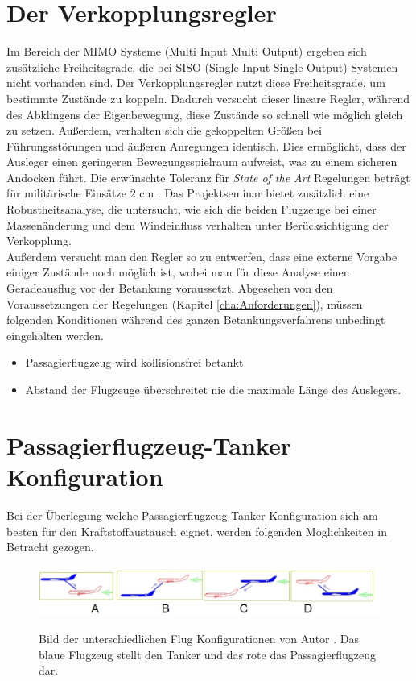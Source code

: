 \section{Der Verkopplungsregler}
Im Bereich der MIMO Systeme (Multi Input Multi Output) ergeben sich zusätzliche Freiheitsgrade, die bei SISO (Single Input Single Output) Systemen nicht vorhanden sind. Der Verkopplungsregler nutzt diese Freiheitsgrade, um bestimmte Zustände zu koppeln. Dadurch versucht dieser lineare Regler, während des Abklingens der Eigenbewegung, diese Zustände so schnell wie möglich gleich zu setzen. Außerdem, verhalten sich die gekoppelten Größen bei Führungsstörungen und äußeren Anregungen identisch. Dies ermöglicht, dass der Ausleger einen geringeren Bewegungsspielraum aufweist, was zu einem sicheren Andocken führt. Die erwünschte Toleranz für \textit{State of the Art} Regelungen beträgt für militärische Einsätze $2$ cm \cite{Autonom1}.  Das Projektseminar bietet zusätzlich eine Robustheitsanalyse, die untersucht, wie sich die beiden Flugzeuge bei einer Massenänderung und dem Windeinfluss verhalten unter Berücksichtigung der Verkopplung.\\
Außerdem versucht man den Regler so zu entwerfen, dass eine externe Vorgabe einiger Zustände noch möglich ist, wobei man für diese Analyse einen Geradeausflug vor der Betankung voraussetzt. Abgesehen von den Voraussetzungen der Regelungen (Kapitel \ref{cha:Anforderungen}), müssen folgenden Konditionen während des ganzen Betankungsverfahrens unbedingt eingehalten werden.
\begin{itemize}
    \item Passagierflugzeug wird kollisionsfrei betankt
    \item Abstand der Flugzeuge überschreitet nie die maximale Länge des Auslegers. 
    
\end{itemize}
\section{Passagierflugzeug-Tanker Konfiguration}
Bei der Überlegung welche Passagierflugzeug-Tanker Konfiguration sich am besten für den Kraftstoffaustausch eignet, werden folgenden Möglichkeiten in Betracht gezogen.
\begin{figure}[h]
\centering 
\includegraphics[scale=0.6]{./Bilder/Konfiguration.jpg}
\label{fig:Konfigurationen}
\caption{Bild der unterschiedlichen Flug Konfigurationen von Autor \cite{RefuelingTime}. Das blaue Flugzeug stellt den Tanker und das rote das Passagierflugzeug dar.}
\end{figure}

